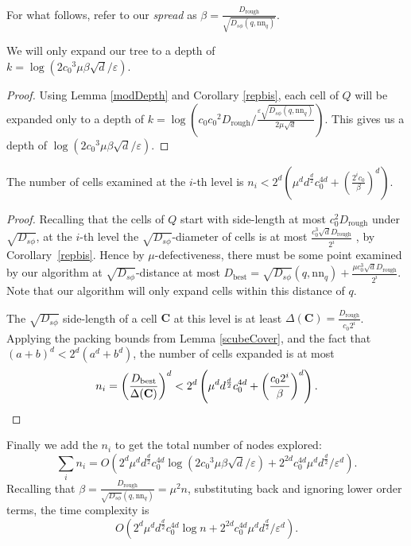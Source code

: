 \documentclass[11pt]{myclass}
\newcommand{\sbreg}{\ensuremath{D_{s\phi}}}
\newcommand{\eps}{\varepsilon}
\begin{document}
For what follows, refer to our \emph{spread} as $\beta =  \frac{D_{\text{rough}}}{\sqrt{\sbreg(q,\text{nn}_q)}}$.

\begin{lemma}\label{treeDepth}
We will only expand our tree to a depth of \\$k= \log (2 {c_0}^3 \mu \beta \sqrt{d}/\eps)$.
\end{lemma}
\begin{proof}
 Using Lemma \ref{modDepth} and Corollary \ref{repbis}, each cell of $Q$ will be expanded only to a depth of 
$k= \log \left( c_0 {c_0}^2  D_{\text{rough}} 
/   \frac{\eps \sqrt{\sbreg(q, \text{nn}_q)}}{2 \mu \sqrt{d}} \right)$. 
This gives us a depth of $\log (2 {c_0}^3 \mu \beta \sqrt{d}/\eps)$.
\end{proof}



\begin{lemma}\label{breathnum}
The number of cells examined at the $i$-th level is  $n_i  < 2^d \left( \mu^d d^{\frac{d}{2}}  c_0^{4d}+ (\frac{2^i c_0}{\beta})^d \right)$.
\end{lemma}

\begin{proof}
Recalling that the cells of $Q$ start with side-length at most $c_0^2 D_{\text{rough}}$ under $\sqrt{\sbreg}$, at the $i$-th level the $\sqrt{\sbreg}$-diameter of cells is at most $\frac{c_0^3 \sqrt{d} D_{\text{rough}}}
{2^i}$ , by Corollary~\ref{repbis}. 
Hence by $\mu$-defectiveness, there must be some point examined by our algorithm at $\sqrt{\sbreg}$-distance at most
$D_{\text{best}} =\sqrt{\sbreg}(q,\text{nn}_q) + \frac{\mu c_0^3 \sqrt{d} D_{\text{rough}}}{2^i}$. Note that our algorithm will
only expand cells within this distance of $q$.

The $\sqrt{\sbreg}$ side-length of a cell $\textbf{C}$ at this level is at least $\Delta(\textbf{C}) = \frac{ D_{\text{rough}}}{c_0 2^i}$. Applying the
packing bounds from Lemma \ref{scubeCover}, and the fact that $(a+b)^d < 2^d(a^d + b^d)$, the number of cells expanded is at most
\[
n_i 
= \left( \frac{D_{\text{best}}}{\Delta(\textbf{C})} \right)^d 
< 2^d \left( \mu^d d^{\frac{d}{2}} c_0^{4d} + \left( \frac{c_0 2^i}{\beta} \right)^d \right).
\qedhere
\]
\end{proof}
Finally we add the 
$n_i$ to get the total number of nodes explored: 
\[ 
\sum_i n_i = O \left( 2^d \mu^d d^{\frac{d}{2}} c_0^{4d} \log (2 {c_0}^3 \mu \beta \sqrt{d}/\eps) + 2^{2d} c_0^{4d} \mu^d d^{\frac{d}{2}}/\eps^d \right).
\]
Recalling that $\beta =\frac{D_{\text{rough}}}{\sqrt{\sbreg}(q,\text{nn}_q)} = \mu^2 n$, substituting back and ignoring lower order terms, the time complexity is 
\[ 
O \left(2^d  \mu^d d^{\frac{d}{2}} c_0^{4d} \log n + 2^{2d} c_0^{4d} \mu^d d^{\frac{d}{2}}/\eps^d \right).
\]
\end{document}
